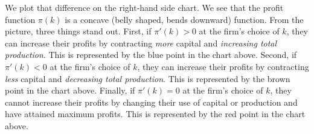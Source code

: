 \documentclass[11pt,letterpaper]{article}
\begin{document}
\begin{center}
\begin{minipage}{0.48\textwidth}
\end{minipage}
\end{center}

We plot that difference on the right-hand side chart. We see that the profit function $\pi(k)$ is a concave (belly shaped, bends downward) function. From the picture, three things stand out. First, if $\pi'(k) >0$ at the firm's choice of $k$, they can increase their profits by contracting \textit{more} capital and \textit{increasing total production}. This is represented by the blue point in the chart above. Second, if $\pi'(k) <0$ at the firm's choice of $k$, they can increase their profits by contracting \textit{less} capital and \textit{decreasing total production}. This is represented by the brown point in the chart above. Finally, if $\pi'(k) =0$ at the firm's choice of $k$, they cannot increase their profits by changing their use of capital or production and have attained maximum profits. This is represented by the red point in the chart above.
\end{document}

